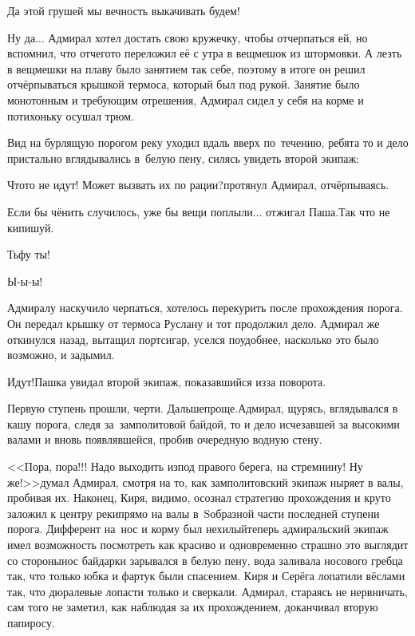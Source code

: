 \diagdash Да этой грушей мы вечность выкачивать будем!

\diagdash Ну да$\ldots$ \mdash Адмирал хотел достать свою кружечку, чтобы отчерпаться ей, но вспомнил, что отчего\sdash то переложил её с утра в вещмешок из штормовки. А лезть в вещмешки на плаву было занятием так себе, поэтому в итоге он решил отчёрпываться крышкой термоса, который был под рукой. Занятие было монотонным и требующим отрешения, Адмирал сидел у себя на корме и потихоньку осушал трюм.

Вид на бурлящую порогом реку уходил вдаль вверх по~течению, ребята то и дело пристально вглядывались в~белую пену, силясь увидеть второй экипаж:

\diagdash Что\sdash то не идут! Может вызвать их по рации?\mdash протянул Адмирал, отчёрпываясь.

\diagdash Если бы чё\sdash нить случилось, уже бы вещи поплыли$\ldots$ \mdash отжигал Паша.\mdash Так что не кипишуй.

\diagdash Тьфу ты!

\diagdash Ы-ы-ы!

Адмиралу наскучило черпаться, хотелось перекурить после прохождения порога. Он передал крышку от термоса Руслану и тот продолжил дело. Адмирал же откинулся назад, вытащил портсигар, уселся поудобнее, насколько это было возможно, и задымил.

\diagdash Идут!\mdash Пашка увидал второй экипаж, показавшийся из\sdash за поворота. 

\diagdash Первую ступень прошли, черти. Дальше\mdash проще.\mdash Адмирал, щурясь, вглядывался в кашу порога, следя за~замполитовой байдой, то и дело исчезавшей за высокими валами и вновь появлявшейся, пробив очередную водную стену.

<<Пора, пора!!! Надо выходить из\sdash под правого берега, на стремнину! Ну же!>>\mdash думал Адмирал, смотря на то, как замполитовский экипаж ныряет в валы, пробивая их. Наконец, Киря, видимо, осознал стратегию прохождения и круто заложил к центру реки\mdash прямо на валы в~S\sdash образной части последней ступени порога. Дифферент на~нос и корму был нехилый\mdash теперь адмиральский экипаж имел возможность посмотреть как красиво и одновременно страшно это выглядит со стороны\mdash нос байдарки зарывался в белую пену, вода заливала носового гребца так, что только юбка и фартук были спасением. Киря и Серёга лопатили вёслами так, что дюралевые лопасти только и сверкали. Адмирал, стараясь не нервничать, сам того не заметил, как наблюдая за их прохождением, доканчивал вторую папиросу.

